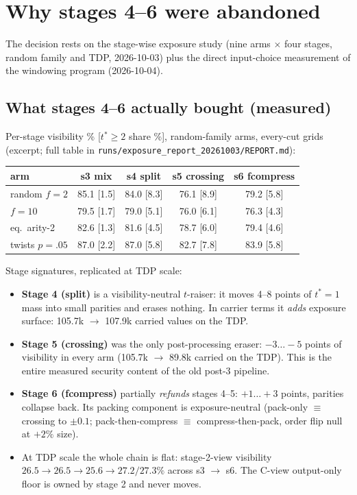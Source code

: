 \documentclass[11pt]{article}
\newcommand{\code}[1]{\texttt{#1}}
\newcommand{\tstar}{t^{*}}
\begin{document}
\section{Why stages 4--6 were abandoned}

The decision rests on the stage-wise exposure study (nine arms $\times$ four
stages, random family and TDP, 2026-10-03) plus the direct input-choice
measurement of the windowing program (2026-10-04).

\subsection{What stages 4--6 actually bought (measured)}

Per-stage visibility \% [$\tstar{\geq}2$ share \%], random-family arms,
every-cut grids (excerpt; full table in
\code{runs/exposure\_report\_20261003/REPORT.md}):

\begin{table}[H]\centering
\begin{tabular}{lcccc}
\toprule
arm & s3 mix & s4 split & s5 crossing & s6 fcompress \\
\midrule
random $f{=}2$ & 85.1 [1.5] & 84.0 [8.3] & 76.1 [8.9] & 79.2 [5.8] \\
$f{=}10$ & 79.5 [1.7] & 79.0 [5.1] & 76.0 [6.1] & 76.3 [4.3] \\
eq.\ arity-2 & 82.6 [1.3] & 81.6 [4.5] & 78.7 [6.0] & 79.4 [4.6] \\
twists $p{=}.05$ & 87.0 [2.2] & 87.0 [5.8] & 82.7 [7.8] & 83.9 [5.8] \\
\bottomrule
\end{tabular}
\end{table}

Stage signatures, replicated at TDP scale:

\begin{itemize}
\item \textbf{Stage 4 (split)} is a visibility-neutral $t$-raiser: it moves
  4--8 points of $\tstar{=}1$ mass into small parities and erases nothing.
  In carrier terms it \emph{adds} exposure surface: 105.7k $\to$ 107.9k
  carried values on the TDP.
\item \textbf{Stage 5 (crossing)} was the only post-processing eraser:
  $-3\ldots{-}5$ points of visibility in every arm (105.7k $\to$ 89.8k
  carried on the TDP). This is the entire measured security content of the
  old post-3 pipeline.
\item \textbf{Stage 6 (fcompress)} partially \emph{refunds} stages 4--5:
  $+1\ldots{+}3$ points, parities collapse back. Its packing component is
  exposure-neutral (pack-only $\equiv$ crossing to $\pm 0.1$;
  pack-then-compress $\equiv$ compress-then-pack, order flip null at $+2\%$
  size).
\item At TDP scale the whole chain is flat: stage-2-view visibility
  $26.5 \to 26.5 \to 25.6 \to 27.2/27.3\%$ across s3 $\to$ s6. The C-view
  output-only floor is owned by stage 2 and never moves.
\end{itemize}
\end{document}
